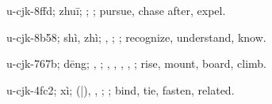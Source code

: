 \begin{multicols}{2}
{\cjkgGlue{}u-cjk-8ffd; zhuī; \cjkgGlue{}\cjkgGlue{}\cjkgGlue{}; \cjkgGlue{}; pursue, chase after, expel.

\cjkgGlue{}u-cjk-8b58; shì, zhì; \cjkgGlue{}\cjkgGlue{}\cjkgGlue{}, \cjkgGlue{}\cjkgGlue{}\cjkgGlue{}; \cjkgGlue{}; recognize, understand, know.

\cjkgGlue{}u-cjk-767b; dēng; \cjkgGlue{}\cjkgGlue{}\cjkgGlue{}, \cjkgGlue{}\cjkgGlue{}\cjkgGlue{}; \cjkgGlue{}, \cjkgGlue{}, \cjkgGlue{}, \cjkgGlue{}, \cjkgGlue{}; rise, mount, board, climb.

\cjkgGlue{}u-cjk-4fc2; xì; \cjkgGlue{}\cjkgGlue{}(\cjkgGlue{}|\cjkgGlue{}), \cjkgGlue{}, \cjkgGlue{}; \cjkgGlue{}; bind, tie, fasten, related.

}
\end{multicols}
